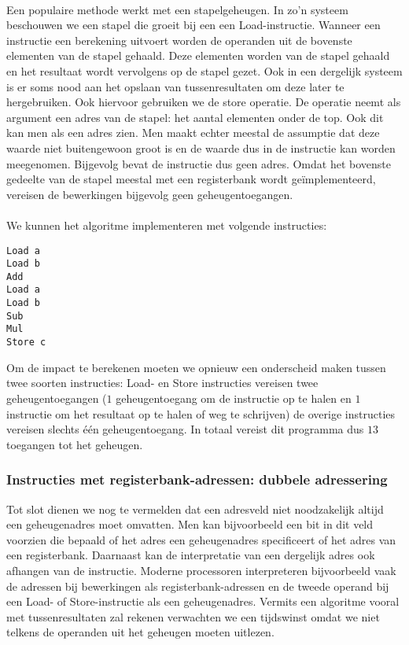 \paragraph{}
Een populaire methode werkt met een stapelgeheugen. In zo'n systeem beschouwen we een stapel die groeit bij een een Load-instructie. Wanneer een instructie een berekening uitvoert worden de operanden uit de bovenste elementen van de stapel gehaald. Deze elementen worden van de stapel gehaald en het resultaat wordt vervolgens op de stapel gezet. Ook in een dergelijk systeem is er soms nood aan het opslaan van tussenresultaten om deze later te hergebruiken. Ook hiervoor gebruiken we de store operatie. De operatie neemt als argument een adres van de stapel: het aantal elementen onder de top. Ook dit kan men als een adres zien. Men maakt echter meestal de assumptie dat deze waarde niet buitengewoon groot is en de waarde dus in de instructie kan worden meegenomen. Bijgevolg bevat de instructie dus geen adres. Omdat het bovenste gedeelte van de stapel meestal met een registerbank wordt ge\"implementeerd, vereisen de bewerkingen bijgevolg geen geheugentoegangen.
\paragraph{}
We kunnen het algoritme implementeren met volgende instructies:
\begin{verbatim}
Load a
Load b
Add
Load a
Load b
Sub
Mul
Store c
\end{verbatim}
Om de impact te berekenen moeten we opnieuw een onderscheid maken tussen twee soorten instructies: Load- en Store instructies vereisen twee geheugentoegangen ($1$ geheugentoegang om de instructie op te halen en $1$ instructie om het resultaat op te halen of weg te schrijven) de overige instructies vereisen slechts \'e\'en geheugentoegang. In totaal vereist dit programma dus $13$ toegangen tot het geheugen.
\subsubsection{Instructies met registerbank-adressen: dubbele adressering}
Tot slot dienen we nog te vermelden dat een adresveld niet noodzakelijk altijd een geheugenadres moet omvatten. Men kan bijvoorbeeld een bit in dit veld voorzien die bepaald of het adres een geheugenadres specificeert of het adres van een registerbank. Daarnaast kan de interpretatie van een dergelijk adres ook afhangen van de instructie. Moderne processoren interpreteren bijvoorbeeld vaak de adressen bij bewerkingen als registerbank-adressen en de tweede operand bij een Load- of Store-instructie als een geheugenadres. Vermits een algoritme vooral met tussenresultaten zal rekenen verwachten we een tijdswinst omdat we niet telkens de operanden uit het geheugen moeten uitlezen.
